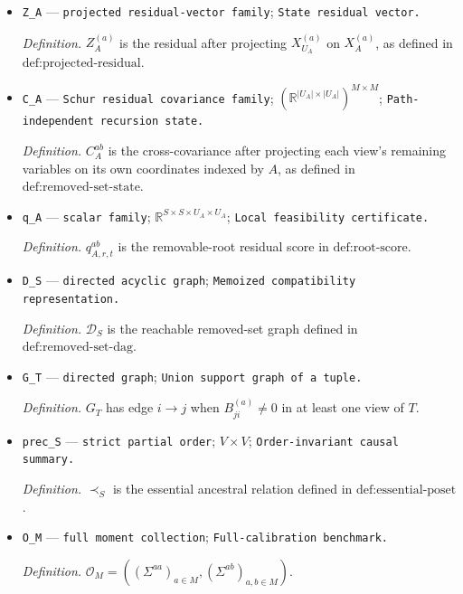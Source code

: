 \documentclass{article}
\begin{document}
\begin{itemize}
  \par\smallskip\noindent\emph{Definition.} \(U_A=V\setminus A\).
  \item \texttt{Z\_\allowbreak{}A} --- \texttt{projected residual-\allowbreak{}vector family}; \texttt{State residual vector.}
  \par\smallskip\noindent\emph{Definition.} \(Z_A^{(a)}\) is the residual after projecting \(X_{U_A}^{(a)}\) on \(X_A^{(a)}\), as defined in \(\text{def:projected-residual}\).
  \item \texttt{C\_\allowbreak{}A} --- \texttt{Schur residual covariance family}; \((\mathbb R^{\lvert U_A\rvert\times\lvert U_A\rvert})^{M\times M}\); \texttt{Path-\allowbreak{}independent recursion state.}
  \par\smallskip\noindent\emph{Definition.} \(C_A^{ab}\) is the cross-covariance after projecting each view's remaining variables on its own coordinates indexed by \(A\), as defined in \(\text{def:removed-set-state}\).
  \item \texttt{q\_\allowbreak{}A} --- \texttt{scalar family}; \(\mathbb R^{S\times S\times U_A\times U_A}\); \texttt{Local feasibility certificate.}
  \par\smallskip\noindent\emph{Definition.} \(q_{A,r,t}^{ab}\) is the removable-root residual score in \(\text{def:root-score}\).
  \item \texttt{D\_\allowbreak{}S} --- \texttt{directed acyclic graph}; \texttt{Memoized compatibility representation.}
  \par\smallskip\noindent\emph{Definition.} \(\mathcal D_S\) is the reachable removed-set graph defined in \(\text{def:removed-set-dag}\).
  \item \texttt{G\_\allowbreak{}T} --- \texttt{directed graph}; \texttt{Union support graph of a tuple.}
  \par\smallskip\noindent\emph{Definition.} \(G_T\) has edge \(i\to j\) when \(B_{ji}^{(a)}\ne0\) in at least one view of \(T\).
  \item \texttt{prec\_\allowbreak{}S} --- \texttt{strict partial order}; \(V\times V\); \texttt{Order-\allowbreak{}invariant causal summary.}
  \par\smallskip\noindent\emph{Definition.} \(\prec_S\) is the essential ancestral relation defined in \(\text{def:essential-poset}\).
  \item \texttt{O\_\allowbreak{}M} --- \texttt{full moment collection}; \texttt{Full-\allowbreak{}calibration benchmark.}
  \par\smallskip\noindent\emph{Definition.} \(\mathcal O_M=((\Sigma^{aa})_{a\in M},(\Sigma^{ab})_{a,b\in M})\).

\end{itemize}
\end{document}
